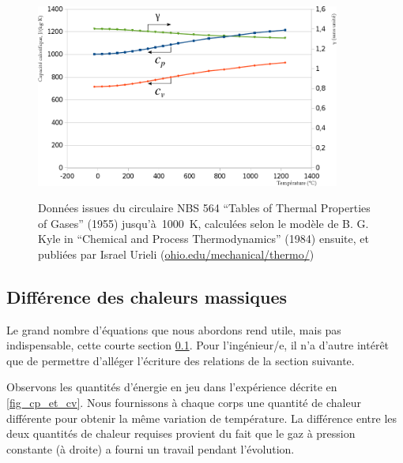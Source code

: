 		\begin{figure}[htb]
			\begin{center}
				\includegraphics[width=10cm]{images/valeurs_cp_cv_air.png}
			\end{center}
				{Données issues du circulaire NBS 564 “Tables of Thermal Properties of Gases” (1955) jusqu’à~\SI{1000}{\kelvin}, calculées selon le modèle de B. G. Kyle in “Chemical and Process Thermodynamics” (1984) ensuite, et publiées par Israel Urieli (\href{http://www.ohio.edu/mechanical/thermo/}{ohio.edu/mechanical/thermo/})}
		\label{fig_valeurs_de_cp_cv_gamma}
		\end{figure}



	\subsection{Différence des chaleurs massiques}
	\label{ch_difference_chaleur_massiques}

		Le grand nombre d’équations que nous abordons rend utile, mais pas indispensable, cette courte section \ref{ch_difference_chaleur_massiques}. Pour l’ingénieur/e, il n’a d’autre intérêt que de permettre d’alléger l’écriture des relations de la section suivante.

		Observons les quantités d’énergie en jeu dans l’expérience décrite en \cref{fig_cp_et_cv}. Nous fournissons à chaque corps une quantité de chaleur différente pour obtenir la même variation de température. La différence entre les deux quantités de chaleur requises provient du fait que le gaz à pression constante (à droite) a fourni un travail pendant l’évolution.

